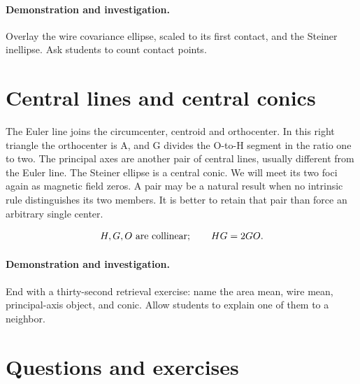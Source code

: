 \documentclass[11pt,oneside,openany]{book}
\begin{document}
\paragraph{Demonstration and investigation.} Overlay the wire covariance ellipse, scaled to its first contact, and the Steiner inellipse. Ask students to count contact points.


\section{Central lines and central conics}\label{sec:slide15}

The Euler line joins the circumcenter, centroid and orthocenter. In this right triangle the orthocenter is A, and G divides the O-to-H segment in the ratio one to two. The principal axes are another pair of central lines, usually different from the Euler line. The Steiner ellipse is a central conic. We will meet its two foci again as magnetic field zeros. A pair may be a natural result when no intrinsic rule distinguishes its two members. It is better to retain that pair than force an arbitrary single center.


\[H,G,O\ \hbox{are collinear};\qquad HG=2GO.\]



\paragraph{Demonstration and investigation.} End with a thirty-second retrieval exercise: name the area mean, wire mean, principal-axis object, and conic. Allow students to explain one of them to a neighbor.


\section*{Questions and exercises}
\end{document}
